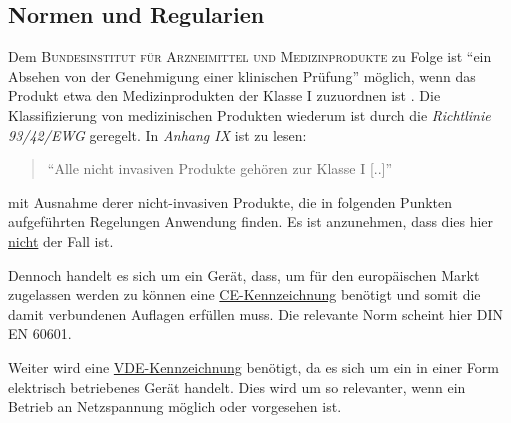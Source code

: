 		\subsection{Normen und Regularien}
			Dem \textsc{Bundesinstitut für Arzneimittel und Medizinprodukte} zu Folge ist \enquote{ein Absehen von der Genehmigung einer klinischen Prüfung} \cite{genehmigungspflicht.BfArM}
			möglich, wenn das Produkt etwa den Medizinprodukten der Klasse I zuzuordnen ist \cite{MPG}. Die Klassifizierung von medizinischen
			Produkten wiederum ist durch die \textit{Richtlinie 93/42/EWG} geregelt. In \textit{Anhang IX} ist zu lesen:
			\begin{quote}
				\enquote{Alle nicht invasiven Produkte gehören zur Klasse I [..]} \cite{directive.93-2-EC.medizinprodukte.2007}
			\end{quote}
			mit Ausnahme derer nicht-invasiven Produkte, die in folgenden Punkten aufgeführten Regelungen Anwendung finden.
			Es ist anzunehmen, dass dies hier \underline{nicht} der Fall ist.\par\medskip

			Dennoch handelt es sich um ein Gerät, dass, um für den europäischen Markt zugelassen werden zu können eine \underline{CE-Kennzeichnung}
			benötigt und somit die damit verbundenen Auflagen erfüllen muss. Die relevante Norm scheint hier \textsc{DIN EN 60601}.\par
			Weiter wird eine \underline{VDE-Kennzeichnung} benötigt, da es sich um ein in einer Form elektrisch betriebenes Gerät handelt.
			Dies wird um so relevanter, wenn ein Betrieb an Netzspannung möglich oder vorgesehen ist.

